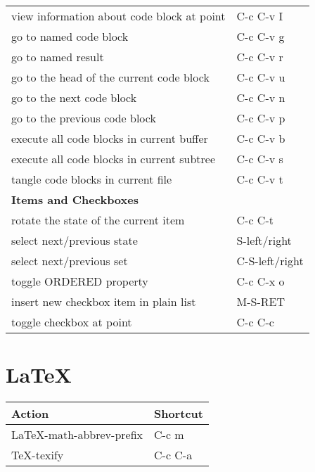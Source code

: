 \documentclass[english]{rcalibrionecolumn}
\begin{document}
\begin{longtable}{ll}
 view information about code block at point    &  C-c C-v I             \\
 go to named code block                        &  C-c C-v g             \\
 go to named result                            &  C-c C-v r             \\
 go to the head of the current code block      &  C-c C-v u             \\
 go to the next code block                     &  C-c C-v n             \\
 go to the previous code block                 &  C-c C-v p             \\
 execute all code blocks in current buffer     &  C-c C-v b             \\
 execute all code blocks in current subtree    &  C-c C-v s             \\
 tangle code blocks in current file            &  C-c C-v t             \\
\hline
 \textbf{Items and Checkboxes}                 &                        \\
 rotate the state of the current item          &  C-c C-t               \\
 select next/previous state                    &  S-left/right          \\
 select next/previous set                      &  C-S-left/right        \\
 toggle ORDERED property                       &  C-c C-x o             \\
 insert new checkbox item in plain list        &  M-S-RET               \\
 toggle checkbox at point                      &  C-c C-c               \\
\end{longtable}
\section{\LaTeX}
\label{sec-14}


\begin{center}
\begin{tabular}{ll}
 \textbf{Action}              &  \textbf{Shortcut}  \\
\hline
 \LaTeX{}-math-abbrev-prefix  &  C-c m              \\
 \TeX{}-texify                &  C-c C-a            \\
\end{tabular}
\end{center}
\end{document}
